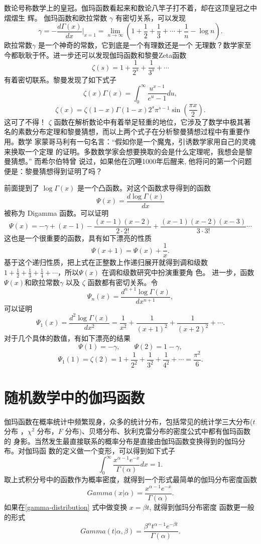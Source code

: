 {数论号称数学上的皇冠。伽玛函数看起来和数论八竿子打不着，却在这顶皇冠之中熠熠生
辉。 伽玛函数和欧拉常数 $\gamma$ 有密切关系，可以发现
$$ \gamma = -\frac{d\Gamma(x)}{dx}|_{x=1} =
\lim_{n\rightarrow \infty}(1+\frac{1}{2} + \frac{1}{3}+\cdots+\frac{1}{n} - \log n) . $$
欧拉常数$\gamma$ 是一个神奇的常数，它到底是一个有理数还是一个
无理数？数学家至今都耿耿于怀。进一步还可以发现伽玛函数和黎曼Zeta函数
$$ \zeta(s) = 1+\frac{1}{2^s} + \frac{1}{3^s} + \cdots $$
有着密切联系。黎曼发现了如下式子
$$ \zeta(x) \Gamma(x) = \int_0^\infty \frac{u^{x-1}}{e^u - 1} du ,$$
$$ \zeta(x) = \zeta(1-x) \Gamma(1-x) 2^s \pi^{s-1} \sin\left(\frac{\pi x}{2}\right)  .$$
这可了不得！ $\zeta$ 函数在解析数论中有着举足轻重的地位，它涉及了数学中极其著
名的素数分布定理和黎曼猜想，而以上两个式子在分析黎曼猜想过程中有重要作用。数学
家蒙哥马利有一句名言：“假如你是一个魔鬼，引诱数学家用自己的灵魂来换取一个定理
的证明。多数数学家会想要换取的会是什么定理呢，我想会是黎曼猜想。” 而希尔伯特曾
说过，如果他在沉睡1000年后醒来, 他将问的第一个问题便是：黎曼猜想得到证明了吗？

前面提到了 $\log\Gamma(x)$ 是一个凸函数。对这个函数求导得到的函数
$$ \Psi(x) = \frac{d\log\Gamma(x)}{dx}  $$
被称为 Digamma 函数。可以证明
$$\Psi(x) = -\gamma + (x-1) - \frac{(x-1)(x-2)}{2\cdot 2!} 
+ \frac{(x-1)(x-2)(x-3)}{3\cdot 3!} \cdots $$
这也是一个很重要的函数，具有如下漂亮的性质
$$ \Psi(x+1) = \Psi(x) + \frac{1}{x} .$$
基于这个递归性质，把上式在正整数上作递归展开就得到调和级数 $1+\frac{1}{2} +
\frac{1}{3} + \frac{1}{4} + \cdots $，所以$\Psi(x)$ 在调和级数研究中扮演重要角
色。 进一步，函数$\Psi(x)$和欧拉常数$\gamma$ 以及 $\zeta$ 函数都有密切关系。令
$$ \Psi_n(x) = \frac{d^{n+1}\log\Gamma(x)}{dx^{n+1}} ,$$
可以证明
$$\Psi_1(x) = \frac{d^{2}\log\Gamma(x)}{dx^{2}}
= \frac{1}{x^2} + \frac{1}{(x+1)^2} + \frac{1}{(x+2)^2} + \cdots .$$
对于几个具体的数值，有如下漂亮的结果
$$\Psi(1) = -\gamma, \quad \quad \Psi(2) = 1-\gamma ,$$
$$\Psi_1(1) = \zeta(2) = 1 + \frac{1}{2^2} + \frac{1}{3^2} + \frac{1}{4^2} +  \cdots 
= \frac{\pi^2}{6} .$$


\section{随机数学中的伽玛函数}

伽玛函数在概率统计中频繁现身，众多的统计分布，包括常见的统计学三大分布($t$ 分布
，$\chi^2$ 分布，$F$ 分布)、贝塔分布、狄利克雷分布的密度公式中都有伽玛函数的
身影。当然发生最直接联系的概率分布是直接由伽玛函数变换得到的伽玛分布。对伽玛函
数的定义做一个变形，可以得到如下式子
\begin{equation}
\label{gamma-distribution}
\int_0^{\infty} \frac{x^{\alpha-1}e^{-x}}{\Gamma(\alpha)}dx = 1 .
\end{equation}
取上式积分号中的函数作为概率密度，就得到一个形式最简单的伽玛分布密度函数
$$Gamma(x|\alpha) = \frac{x^{\alpha-1}e^{-x}}{\Gamma(\alpha)} .$$
如果在\eqref{gamma-distribution} 式中做变换 $x=\beta t$, 就得到伽玛分布密度
函数更一般的形式
$$Gamma(t|\alpha, \beta) = \frac{\beta^\alpha t^{\alpha-1}e^{-\beta t}}{\Gamma(\alpha)} .$$

}
